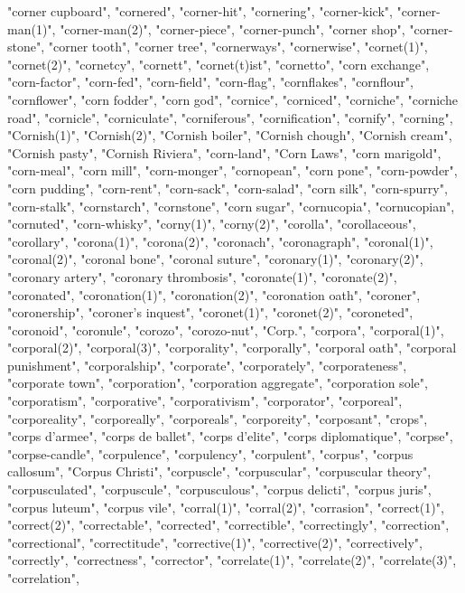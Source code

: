 "corner cupboard",
"cornered",
"corner-hit",
"cornering",
"corner-kick",
"corner-man(1)",
"corner-man(2)",
"corner-piece",
"corner-punch",
"corner shop",
"corner-stone",
"corner tooth",
"corner tree",
"cornerways",
"cornerwise",
"cornet(1)",
"cornet(2)",
"cornetcy",
"cornett",
"cornet(t)ist",
"cornetto",
"corn exchange",
"corn-factor",
"corn-fed",
"corn-field",
"corn-flag",
"cornflakes",
"cornflour",
"cornflower",
"corn fodder",
"corn god",
"cornice",
"corniced",
"corniche",
"corniche road",
"cornicle",
"corniculate",
"corniferous",
"cornification",
"cornify",
"corning",
"Cornish(1)",
"Cornish(2)",
"Cornish boiler",
"Cornish chough",
"Cornish cream",
"Cornish pasty",
"Cornish Riviera",
"corn-land",
"Corn Laws",
"corn marigold",
"corn-meal",
"corn mill",
"corn-monger",
"cornopean",
"corn pone",
"corn-powder",
"corn pudding",
"corn-rent",
"corn-sack",
"corn-salad",
"corn silk",
"corn-spurry",
"corn-stalk",
"cornstarch",
"cornstone",
"corn sugar",
"cornucopia",
"cornucopian",
"cornuted",
"corn-whisky",
"corny(1)",
"corny(2)",
"corolla",
"corollaceous",
"corollary",
"corona(1)",
"corona(2)",
"coronach",
"coronagraph",
"coronal(1)",
"coronal(2)",
"coronal bone",
"coronal suture",
"coronary(1)",
"coronary(2)",
"coronary artery",
"coronary thrombosis",
"coronate(1)",
"coronate(2)",
"coronated",
"coronation(1)",
"coronation(2)",
"coronation oath",
"coroner",
"coronership",
"coroner's inquest",
"coronet(1)",
"coronet(2)",
"coroneted",
"coronoid",
"coronule",
"corozo",
"corozo-nut",
"Corp.",
"corpora",
"corporal(1)",
"corporal(2)",
"corporal(3)",
"corporality",
"corporally",
"corporal oath",
"corporal punishment",
"corporalship",
"corporate",
"corporately",
"corporateness",
"corporate town",
"corporation",
"corporation aggregate",
"corporation sole",
"corporatism",
"corporative",
"corporativism",
"corporator",
"corporeal",
"corporeality",
"corporeally",
"corporeals",
"corporeity",
"corposant",
"crops",
"corps d'armee",
"corps de ballet",
"corps d'elite",
"corps diplomatique",
"corpse",
"corpse-candle",
"corpulence",
"corpulency",
"corpulent",
"corpus",
"corpus callosum",
"Corpus Christi",
"corpuscle",
"corpuscular",
"corpuscular theory",
"corpusculated",
"corpuscule",
"corpusculous",
"corpus delicti",
"corpus juris",
"corpus luteum",
"corpus vile",
"corral(1)",
"corral(2)",
"corrasion",
"correct(1)",
"correct(2)",
"correctable",
"corrected",
"correctible",
"correctingly",
"correction",
"correctional",
"correctitude",
"corrective(1)",
"corrective(2)",
"correctively",
"correctly",
"correctness",
"corrector",
"correlate(1)",
"correlate(2)",
"correlate(3)",
"correlation",
